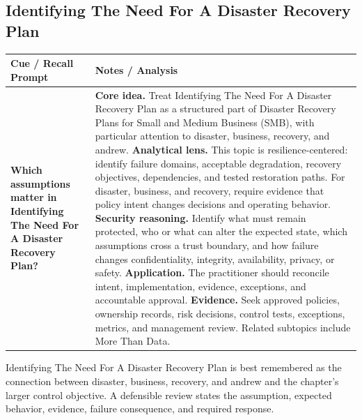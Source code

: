 \documentclass[11pt]{article}
\newcommand{\CornellHeader}{%
\rowcolor{Navy}\color{white}\bfseries Cue / Recall Prompt & \color{white}\bfseries Notes / Analysis\\\hline}
\newcommand{\CornellRow}[2]{%
\cellcolor{CueGray}\RaggedRight\textbf{#1} & \RaggedRight #2\\\hline}
\begin{document}
\subsection*{Identifying The Need For A Disaster Recovery Plan}
\begin{longtable}{>{\RaggedRight\arraybackslash}p{}|>{\RaggedRight\arraybackslash}p{}}
\CornellHeader
\CornellRow{Which assumptions matter in Identifying The Need For A Disaster Recovery Plan?}{\textbf{Core idea.} Treat Identifying The Need For A Disaster Recovery Plan as a structured part of Disaster Recovery Plans for Small and Medium Business (SMB), with particular attention to disaster, business, recovery, and andrew. \textbf{Analytical lens.} This topic is resilience-centered: identify failure domains, acceptable degradation, recovery objectives, dependencies, and tested restoration paths. For disaster, business, and recovery, require evidence that policy intent changes decisions and operating behavior. \textbf{Security reasoning.} Identify what must remain protected, who or what can alter the expected state, which assumptions cross a trust boundary, and how failure changes confidentiality, integrity, availability, privacy, or safety. \textbf{Application.} The practitioner should reconcile intent, implementation, evidence, exceptions, and accountable approval. \textbf{Evidence.} Seek approved policies, ownership records, risk decisions, control tests, exceptions, metrics, and management review. Related subtopics include More Than Data.}
\end{longtable}
\begin{topicsummary}
Identifying The Need For A Disaster Recovery Plan is best remembered as the connection between disaster, business, recovery, and andrew and the chapter's larger control objective. A defensible review states the assumption, expected behavior, evidence, failure consequence, and required response.
\end{topicsummary}
\end{document}
